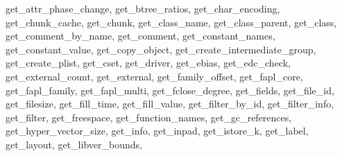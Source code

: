 {{        get_attr_phase_change,%
        get_btree_ratios,%
        get_char_encoding,%
        get_chunk_cache,%
        get_chunk,%
        get_class_name,%
        get_class_parent,%
        get_class,%
        get_comment_by_name,%
        get_comment,%
        get_constant_names,%
        get_constant_value,%
        get_copy_object,%
        get_create_intermediate_group,%
        get_create_plist,%
        get_cset,%
        get_driver,%
        get_ebias,%
        get_edc_check,%
        get_external_count,%
        get_external,%
        get_family_offset,%
        get_fapl_core,%
        get_fapl_family,%
        get_fapl_multi,%
        get_fclose_degree,%
        get_fields,%
        get_file_id,%
        get_filesize,%
        get_fill_time,%
        get_fill_value,%
        get_filter_by_id,%
        get_filter_info,%
        get_filter,%
        get_freespace,%
        get_function_names,%
        get_gc_references,%
        get_hyper_vector_size,%
        get_info,%
        get_inpad,%
        get_istore_k,%
        get_label,%
        get_layout,%
        get_libver_bounds,%
}}
